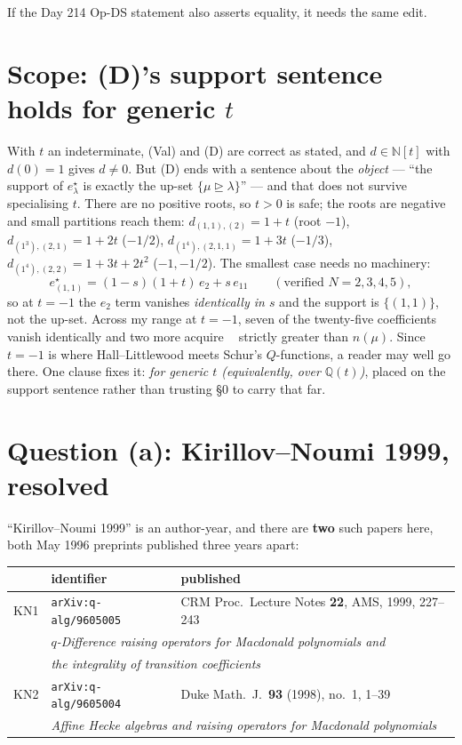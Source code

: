 \documentclass[11pt]{article}
\newcommand{\lam}{\lambda}
\newcommand{\dom}{\trianglerighteq}
\newcommand{\estar}{e^{\star}}
\DeclareMathOperator{\vals}{val_s}
\begin{document}
\noindent If the Day 214 Op-DS statement also asserts equality, it needs the same edit.

\section{Scope: (D)'s support sentence holds for generic $t$}
\label{sec:generic}

With $t$ an indeterminate, (Val) and (D) are correct as stated, and $d\in\mathbb{N}[t]$ with
$d(0)=1$ gives $d\ne0$. But (D) ends with a sentence about the \emph{object} --- ``the
support of $\estar_\lam$ is exactly the up-set $\{\mu\dom\lam\}$'' --- and that does not
survive specialising $t$. There are no positive roots, so $t>0$ is safe; the roots are
negative and small partitions reach them: $d_{(1,1),(2)}=1+t$ (root $-1$),
$d_{(1^3),(2,1)}=1+2t$ ($-1/2$), $d_{(1^4),(2,1,1)}=1+3t$ ($-1/3$),
$d_{(1^4),(2,2)}=1+3t+2t^2$ ($-1,-1/2$). The smallest case needs no machinery:
\[
\estar_{(1,1)}=(1-s)(1+t)\,e_2+s\,e_{11}\qquad(\text{verified }N=2,3,4,5),
\]
so at $t=-1$ the $e_2$ term vanishes \emph{identically in $s$} and the support is
$\{(1,1)\}$, not the up-set. Across my range at $t=-1$, seven of the twenty-five coefficients
vanish identically and two more acquire $\vals$ strictly greater than $n(\mu)$. Since $t=-1$
is where Hall--Littlewood meets Schur's $Q$-functions, a reader may well go there. One clause
fixes it: \emph{for generic $t$ (equivalently, over $\mathbb{Q}(t)$)}, placed on the support
sentence rather than trusting \S0 to carry that far.

\section{Question (a): Kirillov--Noumi 1999, resolved}
\label{sec:kn}

``Kirillov--Noumi 1999'' is an author-year, and there are \textbf{two} such papers here, both
May 1996 preprints published three years apart:

\begin{center}
\begin{tabular}{@{}lll@{}}
\toprule
 & \textbf{identifier} & \textbf{published} \\
\midrule
KN1 & \texttt{arXiv:q-alg/9605005} & CRM Proc.\ Lecture Notes \textbf{22}, AMS, 1999, 227--243 \\
    & \multicolumn{2}{l}{\emph{$q$-Difference raising operators for Macdonald polynomials and}} \\
    & \multicolumn{2}{l}{\emph{the integrality of transition coefficients}} \\
\addlinespace
KN2 & \texttt{arXiv:q-alg/9605004} & Duke Math.\ J.\ \textbf{93} (1998), no.~1, 1--39 \\
    & \multicolumn{2}{l}{\emph{Affine Hecke algebras and raising operators for Macdonald polynomials}} \\
\bottomrule
\end{tabular}
\end{center}
\end{document}

